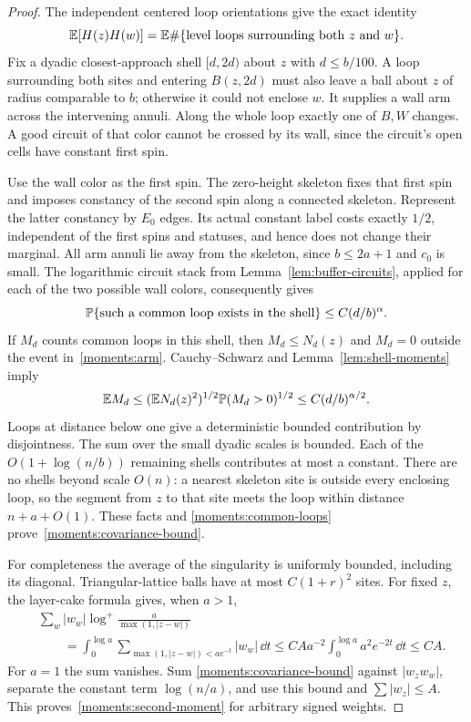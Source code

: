 \begin{proof}
The independent centered loop orientations give the exact identity
\begin{equation}\label{moments:common-loops}
 \mathbb E[H(z)H(w)]
 =\mathbb E\#\{\text{level loops surrounding both $z$ and $w$}\}.
\end{equation}
Fix a dyadic closest-approach shell $[d,2d)$ about $z$ with
$d\leq b/100$.  A loop surrounding both sites and entering $B(z,2d)$
must also leave a ball about $z$ of radius comparable to $b$; otherwise
it could not enclose $w$.  It supplies a wall arm across the intervening
annuli.  Along the whole loop exactly one of $B,W$ changes.  A good
circuit of that color cannot be crossed by its wall, since the circuit's
open cells have constant first spin.

Use the wall color as the first spin.  The zero-height skeleton fixes
that first spin and imposes constancy of the second spin along a
connected skeleton.  Represent the latter constancy by $E_0$ edges.
Its actual constant label costs exactly $1/2$, independent of the
first spins and statuses, and hence does not change their marginal.
All arm annuli lie away from the skeleton, since $b\leq2a+1$ and
$c_0$ is small.  The logarithmic circuit stack from
Lemma~\ref{lem:buffer-circuits}, applied for each of the two possible
wall colors, consequently gives
\begin{equation}\label{moments:arm}
 \mathbb P\{\text{such a common loop exists in the shell}\}
 \leq C(d/b)^\alpha.
\end{equation}
If $M_d$ counts common loops in this shell, then
$M_d\leq N_d(z)$ and $M_d=0$ outside the event in~\eqref{moments:arm}.
Cauchy--Schwarz and Lemma~\ref{lem:shell-moments} imply
\[
 \mathbb E M_d\leq (\mathbb E N_d(z)^2)^{1/2}
       \mathbb P(M_d>0)^{1/2}
 \leq C(d/b)^{\alpha/2}.
\]
Loops at distance below one give a deterministic bounded contribution
by disjointness.  The sum over the small dyadic scales is bounded.
Each of the
$O(1+\log(n/b))$ remaining shells contributes at most a constant.
There are no shells beyond scale $O(n)$: a nearest skeleton site is
outside every enclosing loop, so the segment from $z$ to that site
meets the loop within distance $n+a+O(1)$.  These facts and
\eqref{moments:common-loops} prove~\eqref{moments:covariance-bound}.

For completeness the average of the singularity is uniformly bounded,
including its diagonal.  Triangular-lattice balls have at most
$C(1+r)^2$ sites.  For fixed $z$, the layer-cake formula gives, when
$a>1$,
\begin{align*}
 &\sum_w |w_w|\log^+\frac{a}{\max(1,|z-w|)}\\
 &\qquad=\int_0^{\log a}
      \sum_{\max(1,|z-w|)<ae^{-t}}|w_w|\,\dd t
 \leq C A a^{-2}\int_0^{\log a}a^2e^{-2t}\,\dd t
 \leq C A.
\end{align*}
For $a=1$ the sum vanishes.  Sum
\eqref{moments:covariance-bound} against $|w_zw_w|$, separate the
constant term $\log(n/a)$, and use this bound and
$\sum|w_z|\leq A$.  This proves~\eqref{moments:second-moment}
for arbitrary signed weights.
\end{proof}

